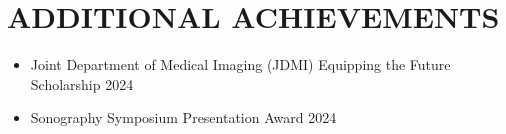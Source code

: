 
\section{\textcolor{airforceblue}{ADDITIONAL ACHIEVEMENTS}}
    \begin{itemize}[leftmargin=0.15in, itemsep=0pt, parsep=0pt]
        \item Joint Department of Medical Imaging (JDMI) Equipping the Future Scholarship \hfill 2024
        \item Sonography Symposium Presentation Award \hfill 2024
    \end{itemize}

\vspace{-12pt}
